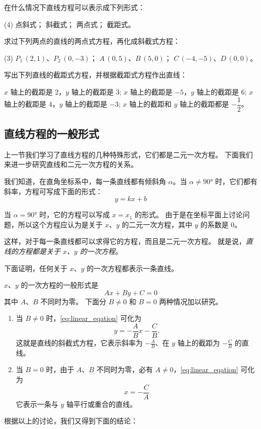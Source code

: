 \begin{Practice}
  \begin{question}
    \item 在什么情况下直线方程可以表示成下列形式：
    \begin{tasks}(4)
      \task 点斜式；
      \task 斜截式；
      \task 两点式；
      \task 截距式。
    \end{tasks}
    \item 求过下列两点的直线的两点式方程，再化成斜截式方程：
    \begin{tasks}(3)
      \task $P_1\,(2,1)$、$P_2\,(0,-3)$；
      \task $A\,(0,5)$、$B\,(5,0)$；
      \task $C\,(-4,-5)$、$D\,(0,0)$。
    \end{tasks}
    \item 写出下列直线的截距式方程，并根据截距式方程作出直线：
    \begin{tasks}
      \task $x$ 轴上的截距是 2，$y$ 轴上的截距是 3;
      \task $x$ 轴上的截距是 $-5$，$y$ 轴上的截距是 6;
      \task $x$ 轴上的截距是 4，$y$ 轴上的截距是 $-3$;
      \task $x$ 轴上的截距和 $y$ 轴上的截距都是 $-\dfrac{1}{2}$。
    \end{tasks}
  \end{question}
\end{Practice}

\subsection{直线方程的一般形式}
上一节我们学习了直线方程的几种特殊形式，它们都是二元一次方程。
下面我们来进一步研究直线和二元一次方程的关系。

我们知道，在直角坐标系中，每一条直线都有倾斜角 $\alpha$。当 $\alpha\neq\ang{90}$ 时，它们都有斜率，方程可写成下面的形式：
\[y = kx + b\]

当 $\alpha=\ang{90}$ 时，它的方程可以写成 $x=x_1$ 的形式。
由于是在坐标平面上讨论问题，所以这个方程应认为是关于 $x$、$y$ 的二元一次方程，其中 $y$ 的系数是 0。

这样，对于每一条直线都可以求得它的方程，而且是二元一次方程。
就是说，\emph{直线的方程都是关于 $x$、$y$ 的一次方程}。

下面证明，任何关于 $x$、$y$ 的一次方程都表示一条直线。

$x$、$y$ 的一次方程的一般形式是
\begin{equation}
  \label{eq:linear_eqation}
  Ax+By+C=0
\end{equation}
其中 $A$、$B$ 不同时为零。
下面分 $B\neq 0$ 和 $B=0$ 两种情况加以研究。
\begin{enumerate}
  \item 当 $B\neq 0$ 时，\cref{eq:linear_eqation} 可化为
  \[ y=-\frac{A}{B}x-\frac{C}{B}.\]
  这就是直线的斜截式方程，它表示斜率为 $-\frac{A}{B}$、在 $y$ 轴上的截距为 $-\frac{C}{B}$ 的直线。
  \item 当 $B=0$ 时，由于  $A$、$B$ 不同时为零，必有 $A\neq 0$，\cref{eq:linear_eqation} 可化为
  \[x=-\frac{C}{A}\]
  它表示一条与 $y$ 轴平行或重合的直线。
\end{enumerate}
根据以上的讨论，我们又得到下面的结论：

